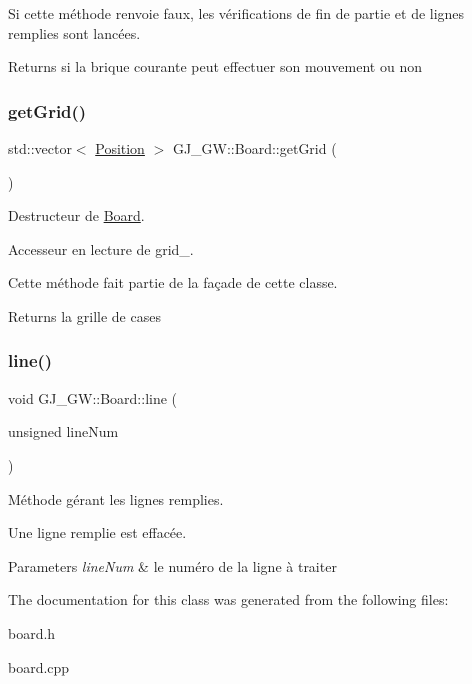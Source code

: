 Si cette méthode renvoie faux, les vérifications de fin de partie et de lignes remplies sont lancées.

\begin{DoxyReturn}{Returns}
si la brique courante peut effectuer son mouvement ou non 
\end{DoxyReturn}
\hypertarget{class_g_j___g_w_1_1_board_a3360e1825ba9b116fbbca29db0b1464c}{}\label{class_g_j___g_w_1_1_board_a3360e1825ba9b116fbbca29db0b1464c} 
\subsubsection{\texorpdfstring{get\+Grid()}{getGrid()}}
{\footnotesize\ttfamily std\+::vector$<$ \hyperlink{class_g_j___g_w_1_1_position}{Position} $>$ G\+J\+\_\+\+G\+W\+::\+Board\+::get\+Grid (\begin{DoxyParamCaption}{ }\end{DoxyParamCaption})\hspace{0.3cm}{\ttfamily [inline]}}



Destructeur de \hyperlink{class_g_j___g_w_1_1_board}{Board}. 

Accesseur en lecture de grid\+\_\+.

Cette méthode fait partie de la façade de cette classe.

\begin{DoxyReturn}{Returns}
la grille de cases 
\end{DoxyReturn}
\hypertarget{class_g_j___g_w_1_1_board_a54c122c1ebdd27a5f9375a673f436dab}{}\label{class_g_j___g_w_1_1_board_a54c122c1ebdd27a5f9375a673f436dab} 
\subsubsection{\texorpdfstring{line()}{line()}}
{\footnotesize\ttfamily void G\+J\+\_\+\+G\+W\+::\+Board\+::line (\begin{DoxyParamCaption}\item[{unsigned}]{line\+Num }\end{DoxyParamCaption})}



Méthode gérant les lignes remplies. 

Une ligne remplie est effacée.


\begin{DoxyParams}{Parameters}
{\em line\+Num} & le numéro de la ligne à traiter \\
\hline
\end{DoxyParams}


The documentation for this class was generated from the following files\+:\begin{DoxyCompactItemize}
\item 
board.\+h\item 
board.\+cpp\end{DoxyCompactItemize}
